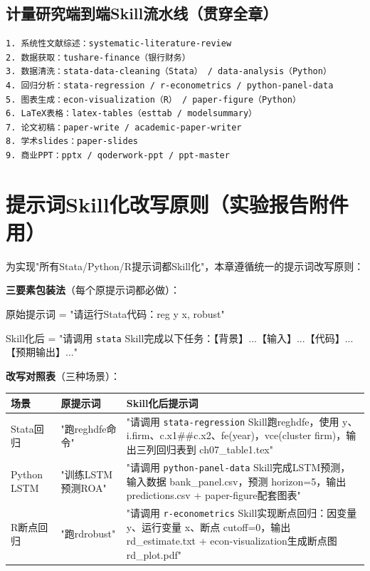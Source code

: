 \subsection{计量研究端到端Skill流水线（贯穿全章）}

\begin{lstlisting}
1. 系统性文献综述：systematic-literature-review
2. 数据获取：tushare-finance（银行财务）
3. 数据清洗：stata-data-cleaning（Stata） / data-analysis（Python）
4. 回归分析：stata-regression / r-econometrics / python-panel-data
5. 图表生成：econ-visualization（R） / paper-figure（Python）
6. LaTeX表格：latex-tables（esttab / modelsummary）
7. 论文初稿：paper-write / academic-paper-writer
8. 学术slides：paper-slides
9. 商业PPT：pptx / qoderwork-ppt / ppt-master
\end{lstlisting}

\section{提示词Skill化改写原则（实验报告附件用）}


为实现"所有Stata/Python/R提示词都Skill化"，本章遵循统一的提示词改写原则：

\textbf{三要素包装法}（每个原提示词都必做）：

原始提示词 = "请运行Stata代码：reg y x, robust"

Skill化后 = "请调用 \texttt{stata} Skill完成以下任务：【背景】...【输入】...【代码】...【预期输出】..."

\textbf{改写对照表}（三种场景）：

\begin{table}[H]
\centering
\begin{tabular}{lp{4cm}p{7cm}}
\toprule
\textbf{场景} & \textbf{原提示词} & \textbf{Skill化后提示词} \\
\midrule
Stata回归 & "跑reghdfe命令" & "请调用 \texttt{stata-regression} Skill跑reghdfe，使用 y、i.firm、c.x1\#\#c.x2、fe(year)，vce(cluster firm)，输出三列回归表到 ch07\_table1.tex" \\
Python LSTM & "训练LSTM预测ROA" & "请调用 \texttt{python-panel-data} Skill完成LSTM预测，输入数据 bank\_panel.csv，预测 horizon=5，输出 predictions.csv + paper-figure配套图表" \\
R断点回归 & "跑rdrobust" & "请调用 \texttt{r-econometrics} Skill实现断点回归：因变量 y、运行变量 x、断点 cutoff=0，输出 rd\_estimate.txt + econ-visualization生成断点图 rd\_plot.pdf" \\
\bottomrule
\end{tabular}
\end{table}

